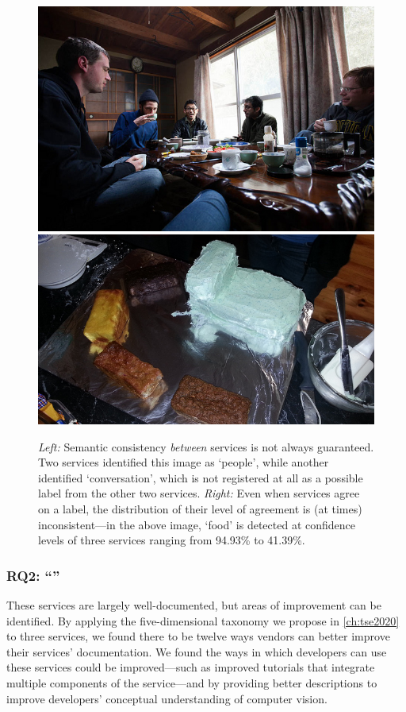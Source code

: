 \begin{figure}[h]
    \centering
    \includegraphics[width=0.45\linewidth]{mainmatter/publications/figures/icsme2019/000000009590.jpg}
    \hfill
    \includegraphics[width=0.45\linewidth]{mainmatter/publications/figures/icsme2019/000000095707.jpg}
    \caption[Results from computer vision services can be disparate and non-static]{\textit{Left:} Semantic consistency \textit{between} services is not always guaranteed. Two services identified this image as `people', while another identified `conversation', which is not registered at all as a possible label from the other two services. \textit{Right:} Even when services agree on a label, the distribution of their level of agreement is (at times) inconsistent---in the above image, `food' is detected at confidence levels of three services ranging from 94.93\% to 41.39\%.}
    \label{fig:conclusion:consistency}
\end{figure}

\subsubsection*{RQ2: ``\RQTwoTextDocumentation{}''}
\begin{callout}
These services are largely well-documented, but areas of improvement can be identified. By applying the five-dimensional taxonomy we propose in \cref{ch:tse2020} to three services, we found there to be  twelve ways vendors can better improve their services' documentation. We found the ways in which developers can use these services could be improved---such as improved tutorials that integrate \textup{multiple} components of the service---and by providing better descriptions to improve developers' conceptual understanding of computer vision.
\end{callout}

